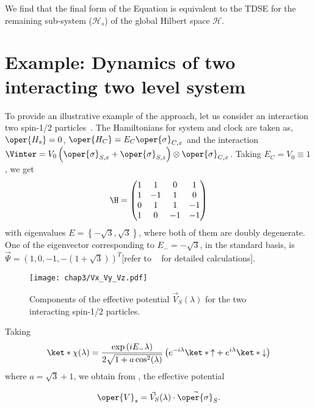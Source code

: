 We find that the final form of the Equation is equivalent to the TDSE for the remaining sub-system (\(\mathcal{H}_s\)) of the
global Hilbert space \(\mathcal{H}\).

\section{Example: Dynamics of two interacting two level system\label{sec:chap3_2spin_interact}}

To provide an illustrative example of the approach, let us consider an interaction two spin-1/2 particles~\cite{Gemsheim:2023izg}.
The Hamiltonians for system and clock are taken as, \(\oper{H_s} = 0\), \(\oper{H_C} = E_C\oper{\sigma}_{C, x}\)
and the interaction 
\(\Vinter = V_0\left(\oper{\sigma}_{S, x} + \oper{\sigma}_{S, z}\right)\otimes \oper{\sigma}_{C, x}\). 
Taking \(E_C = V_0 \equiv 1\), we get
\begin{equation}
    \H = \begin{pmatrix}
        1 & 1 & 0 & 1 \\
        1 & -1 & 1 & 0 \\
        0 & 1 & 1 & -1 \\
        1 & 0 & -1 & -1
        \end{pmatrix}
\end{equation}
with eigenvalues \(E = \left\{-\sqrt{3}, \sqrt{3}\right\}\), 
where both of them are doubly degenerate. One of the eigenvector
corresponding to \(E_- = -\sqrt{3}\), in the standard basis, is
\(\vec{\Psi} = \left(1, 0, -1, -(1 + \sqrt{3})\right)^T\)[refer to ~ for detailed calculations].
\begin{figure}[!h]
    \centering
    \texttt{[image: chap3/Vx\_Vy\_Vz.pdf]}
    \caption{Components of the effective potential \(\vec{V}_S(\lambda)\) for the two interacting spin-1/2 particles.}
    \label{fig:chap3_effective_potential}
\end{figure}


Taking
\begin{equation}
    \ket*{\chi(\lambda)} = 
    \frac{\exp\left(i E_- \lambda\right)}{
        2\sqrt{1 + a \cos^2(\lambda)}} \left(e^{-i\lambda} \ket*{\uparrow} + e^{i\lambda} \ket*{\downarrow} \right)
\end{equation} 
where \(a = \sqrt{3} + 1\), we obtain from , the effective potential

\begin{equation}
    \oper{V}_s = \vec{V}_S(\lambda)\cdot\vec{\oper{\sigma}}_S. 
\end{equation}

